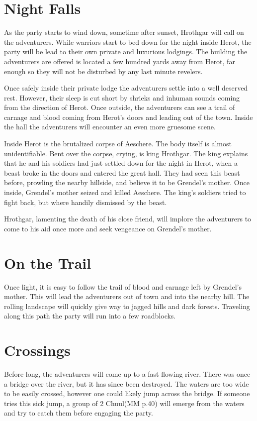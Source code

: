 \documentclass[10pt,twoside,twocolumn,openany]{book}
\begin{document}
\section{Night Falls}
As the party starts to wind down, sometime after sunset, Hrothgar will call on the adventurers. While warriors start to bed down for the night inside Herot, the party will be lead to their own private and luxurious lodgings. The building the adventurers are offered is located a few hundred yards away from Herot, far enough so they will not be disturbed by any last minute revelers.

Once safely inside their private lodge the adventurers settle into a well deserved rest. However, their sleep is cut short by shrieks and inhuman sounds coming from the direction of Herot. Once outside, the adventurers can see a trail of carnage and blood coming from Herot's doors and leading out of the town. Inside the hall the adventurers will encounter an even more gruesome scene.

Inside Herot is the brutalized corpse of Aeschere. The body itself is almost unidentifiable. Bent over the corpse, crying, is king Hrothgar. The king explains that he and his soldiers had just settled down for the night in Herot, when a beast broke in the doors and entered the great hall. They had seen this beast before, prowling the nearby hillside, and believe it to be Grendel's mother. Once inside, Grendel's mother seized and killed Aeschere. The king's soldiers tried to fight back, but where handily dismissed by the beast.

Hrothgar, lamenting the death of his close friend, will implore the adventurers to come to his aid once more and seek vengeance on Grendel's mother.

\section{On the Trail}

Once light, it is easy to follow the trail of blood and carnage left by Grendel's mother. This will lead the adventurers out of town and into the nearby hill. The rolling landscape will quickly give way to jagged hills and dark forests. Traveling along this path the party will run into a few roadblocks.

\section{Crossings}

Before long, the adventurers will come up to a fast flowing river. There was once a bridge over the river, but it has since been destroyed. The waters are too wide to be easily crossed, however one could likely jump across the bridge. If someone tries this sick jump, a group of 2 Chuul(MM p.40) will emerge from the waters and try to catch them before engaging the party.
\end{document}
